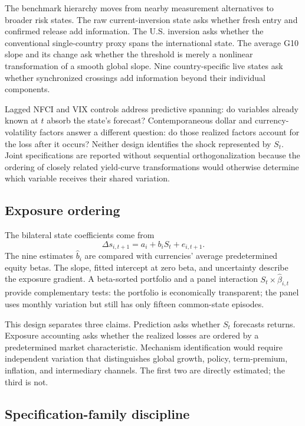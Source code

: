 The benchmark hierarchy moves from nearby measurement alternatives to broader risk states. The raw current-inversion state asks whether fresh entry and confirmed release add information. The U.S. inversion asks whether the conventional single-country proxy spans the international state. The average G10 slope and its change ask whether the threshold is merely a nonlinear transformation of a smooth global slope. Nine country-specific live states ask whether synchronized crossings add information beyond their individual components.

Lagged NFCI and VIX controls address predictive spanning: do variables already known at $t$ absorb the state's forecast? Contemporaneous dollar and currency-volatility factors answer a different question: do those realized factors account for the loss after it occurs? Neither design identifies the shock represented by $S_t$. Joint specifications are reported without sequential orthogonalization because the ordering of closely related yield-curve transformations would otherwise determine which variable receives their shared variation.

\subsection{Exposure ordering}

The bilateral state coefficients come from
\begin{equation}
    \Delta s_{i,t+1}=a_i+b_iS_t+e_{i,t+1}.
    \label{eq:bilateral_state}
\end{equation}
The nine estimates $\widehat b_i$ are compared with currencies' average predetermined equity betas. The slope, fitted intercept at zero beta, and uncertainty describe the exposure gradient. A beta-sorted portfolio and a panel interaction $S_t\times\widehat\beta_{i,t}$ provide complementary tests: the portfolio is economically transparent; the panel uses monthly variation but still has only fifteen common-state episodes.

This design separates three claims. Prediction asks whether $S_t$ forecasts returns. Exposure accounting asks whether the realized losses are ordered by a predetermined market characteristic. Mechanism identification would require independent variation that distinguishes global growth, policy, term-premium, inflation, and intermediary channels. The first two are directly estimated; the third is not.

\subsection{Specification-family discipline}

